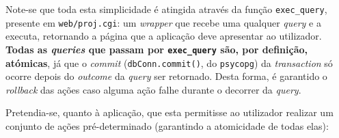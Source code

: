 \documentclass[12pt,a4paper]{article}
\begin{document}
Note-se que toda esta simplicidade é atingida através da função \texttt{exec\_query},
presente em \texttt{web/proj.cgi}: um \textit{wrapper} que recebe uma qualquer
\textit{query} e a executa, retornando a página que a aplicação deve apresentar
ao utilizador. \textbf{Todas as \textit{queries} que passam por \texttt{exec\_query} são,
  por definição, atómicas}, já que o \textit{commit} (\texttt{dbConn.commit()}, do \texttt{psycopg})
da \textit{transaction} só ocorre depois do \textit{outcome} da \textit{query}
ser retornado. Desta forma, é garantido o \textit{rollback} das ações caso alguma
ação falhe durante o decorrer da \textit{query}.

\vspace*{0.5cm}

Pretendia-se, quanto à aplicação, que esta permitisse ao utilizador realizar um conjunto
de ações pré-determinado (garantindo a atomicidade de todas elas):
\end{document}
